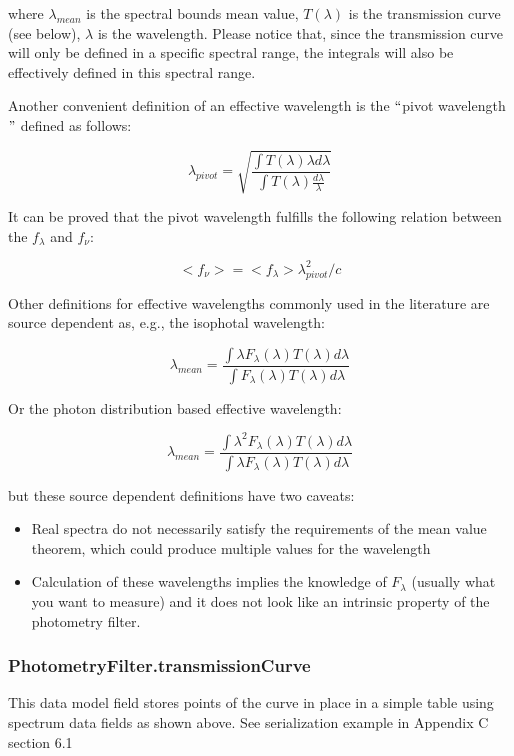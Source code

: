 \documentclass[11pt,a4paper]{ivoa}
\begin{document}
where $\lambda_{mean}$ is the spectral bounds mean value, $T(\lambda)$ is the transmission curve (see below), $\lambda$ is the wavelength. Please notice that, since the transmission curve will only be defined in a specific spectral range, the integrals will also be effectively defined in this spectral range.
\par

Another convenient definition of an effective wavelength is the $``$pivot wavelength$"$  defined as follows:
\par

\[
\lambda_{pivot} = \sqrt{\frac{\int T(\lambda)\lambda d\lambda}{\int T(\lambda)\frac{d\lambda}{\lambda}}}
\]

It can be proved that the pivot wavelength fulfills the following relation between the $f_\lambda$ and  $f_\nu $:
\par

\[
<f_\nu >=<f_\lambda >\lambda^2_{pivot}/c
\]

Other definitions for effective wavelengths commonly used in the literature are source dependent as, e.g., the isophotal wavelength:
\par
\[
\lambda_{mean} = \frac{\int \lambda F_\lambda(\lambda)T(\lambda)d\lambda}{\int F_\lambda(\lambda)T(\lambda)d\lambda}
\]

Or the photon distribution based effective wavelength:
\par
\[
\lambda_{mean} = \frac{\int \lambda^2 F_\lambda(\lambda)T(\lambda)d\lambda}{\int \lambda F_\lambda(\lambda)T(\lambda)d\lambda}
\]

but these source dependent definitions have two caveats:
\par

\begin{itemize}
	\item Real spectra do not necessarily satisfy the requirements of the mean value theorem, which could produce multiple values for the wavelength

	\item Calculation of these wavelengths implies the knowledge of $F_\lambda $ (usually what you want to measure) and it does not look like an intrinsic property of the photometry filter.
\end{itemize}\par

\subsubsection{PhotometryFilter.transmissionCurve}
This data model field stores points of the curve in place in a simple table using spectrum data fields as shown above. See serialization example in Appendix C section 6.1\par
\end{document}
